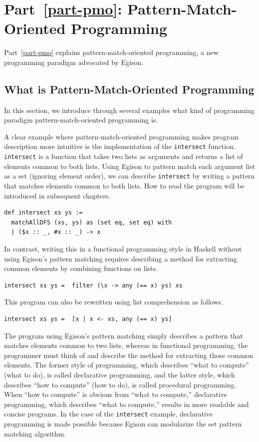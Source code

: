 \section{Part~\ref{part-pmo}: Pattern-Match-Oriented Programming}\label{intro-pmo}

Part~\ref{part-pmo} explains pattern-match-oriented programming, a new programming paradigm advocated by Egison.

\subsection{What is Pattern-Match-Oriented Programming}

In this section, we introduce through several examples what kind of programming paradigm pattern-match-oriented programming is.

A clear example where pattern-match-oriented programming makes program description more intuitive is the implementation of the \lstinline{intersect} function.
\lstinline{intersect} is a function that takes two lists as arguments and returns a list of elements common to both lists.
Using Egison to pattern match each argument list as a set (ignoring element order), we can describe \lstinline{intersect} by writing a pattern that matches elements common to both lists.
How to read the program will be introduced in subsequent chapters.
\begin{lstlisting}[language=egison,numbers=none]
def intersect xs ys :=
  matchAllDFS (xs, ys) as (set eq, set eq) with
  | ($x :: _, #x :: _) -> x
\end{lstlisting}
In contrast, writing this in a functional programming style in Haskell without using Egison's pattern matching requires describing a method for extracting common elements by combining functions on lists.
\begin{lstlisting}[language=egison,numbers=none]
intersect xs ys =  filter (\x -> any (== x) ys) xs
\end{lstlisting}
This program can also be rewritten using list comprehension as follows.
\begin{lstlisting}[language=egison,numbers=none]
intersect xs ys =  [x | x <- xs, any (== x) ys]
\end{lstlisting}

The program using Egison's pattern matching simply describes a pattern that matches elements common to two lists, whereas in functional programming, the programmer must think of and describe the method for extracting those common elements.
The former style of programming, which describes ``what to compute'' (what to do), is called declarative programming, and the latter style, which describes ``how to compute'' (how to do), is called procedural programming.
When ``how to compute'' is obvious from ``what to compute,'' declarative programming, which describes ``what to compute,'' results in more readable and concise programs.
In the case of the \lstinline{intersect} example, declarative programming is made possible because Egison can modularize the set pattern matching algorithm.

